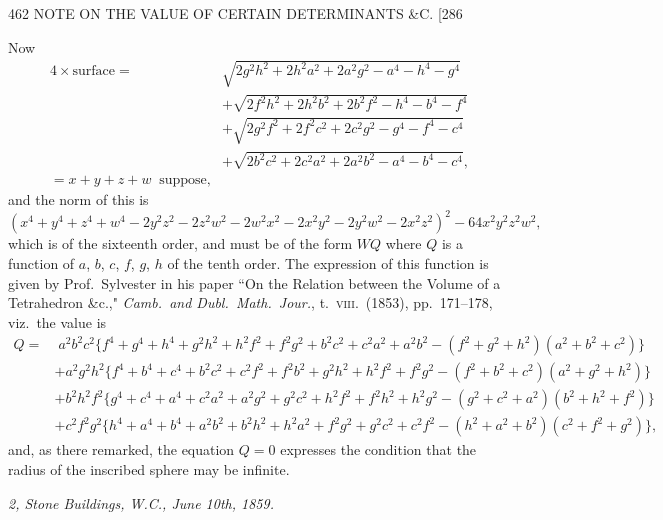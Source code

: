\documentclass[11pt]{article}
\begin{document}
\begin{center}
462 \hfill NOTE ON THE VALUE OF CERTAIN DETERMINANTS \&C. \hfill \textsc{[286}
\end{center}

Now
\begin{align*}
4\times\text{surface} = &\sqrt{2g^{2}h^{2}+2h^{2}a^{2}+2a^{2}g^{2}-a^{4}-h^{4}-g^{4}}\\
& +\sqrt{2f^{2}h^{2}+2h^{2}b^{2}+2b^{2}f^{2}-h^{4}-b^{4}-f^{4}}\\
& +\sqrt{2g^{2}f^{2}+2f^{2}c^{2}+2c^{2}g^{2}-g^{4}-f^{4}-c^{4}}\\
& +\sqrt{2b^{2}c^{2}+2c^{2}a^{2}+2a^{2}b^{2}-a^{4}-b^{4}-c^{4}},\\
= x+y+z+w \;\;\text{suppose,}
\end{align*}
and the norm of this is
\[ (x^{4}+y^{4}+z^{4}+w^{4}-2y^{2}z^{2}-2z^{2}w^{2}-2w^{2}x^{2}-2x^{2}y^{2}-2y^{2}w^{2}-2x^{2}z^{2})^{2}-64x^{2}y^{2}z^{2}w^{2}, \]
which is of the sixteenth order, and must be of the form $WQ$ where $Q$ is a function
of $a$, $b$, $c$, $f$, $g$, $h$ of the tenth order. The expression of this function is given by
Prof.\ Sylvester in his paper ``On the Relation between the Volume of a Tetrahedron
\&c.," \textit{Camb.\ and Dubl.\ Math.\ Jour.}, t.~\textsc{viii}.\ (1853), pp.~171--178, viz.\ the value is
\begin{align*}
Q = & \; a^{2}b^{2}c^{2}\{f^{4}+g^{4}+h^{4}+g^{2}h^{2}+h^{2}f^{2}+f^{2}g^{2}+b^{2}c^{2}+c^{2}a^{2}+a^{2}b^{2}-(f^{2}+g^{2}+h^{2})(a^{2}+b^{2}+c^{2})\}\\
& +a^{2}g^{2}h^{2}\{f^{4}+b^{4}+c^{4}+b^{2}c^{2}+c^{2}f^{2}+f^{2}b^{2}+g^{2}h^{2}+h^{2}f^{2}+f^{2}g^{2}-(f^{2}+b^{2}+c^{2})(a^{2}+g^{2}+h^{2})\}\\
& +b^{2}h^{2}f^{2}\{g^{4}+c^{4}+a^{4}+c^{2}a^{2}+a^{2}g^{2}+g^{2}c^{2}+h^{2}f^{2}+f^{2}h^{2}+h^{2}g^{2}-(g^{2}+c^{2}+a^{2})(b^{2}+h^{2}+f^{2})\}\\
& +c^{2}f^{2}g^{2}\{h^{4}+a^{4}+b^{4}+a^{2}b^{2}+b^{2}h^{2}+h^{2}a^{2}+f^{2}g^{2}+g^{2}c^{2}+c^{2}f^{2}-(h^{2}+a^{2}+b^{2})(c^{2}+f^{2}+g^{2})\},
\end{align*}
and, as there remarked, the equation $Q=0$ expresses the condition that the radius
of the inscribed sphere may be infinite.

\smallskip

\hfill\textit{2, Stone Buildings, W.C., June 10th, 1859.}
\end{document}
